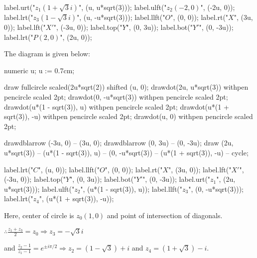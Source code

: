       label.urt("$z_1(1 + \sqrt{3}i)$", (u, u*sqrt(3)));
      label.ulft("$z_2(-2, 0)$", (-2u, 0));
      label.lrt("$z_3(1 - \sqrt{3}i)$", (u, -u*sqrt(3)));
      label.llft("$O$", (0, 0));
      label.rt("$X$", (3u, 0));
      label.lft("$X'$", (-3u, 0));
      label.top("$Y$", (0, 3u));
      label.bot("$Y'$", (0, -3u));
      label.lrt("$P(2, 0)$", (2u, 0));
    \stopMPcode
  \stopplacefigure
\item The diagram is given below:

    \startplacefigure[location=force]
    \startMPcode
      numeric u;
      u := 0.7cm;

      draw fullcircle scaled(2u*sqrt(2)) shifted (u, 0);
      drawdot(2u, u*sqrt(3)) withpen pencircle scaled 2pt;
      drawdot(0, -u*sqrt(3)) withpen pencircle scaled 2pt;
      drawdot(u*(1 - sqrt(3)), u) withpen pencircle scaled 2pt;
      drawdot(u*(1 + sqrt(3)), -u) withpen pencircle scaled 2pt;
      drawdot(u, 0) withpen pencircle scaled 2pt;

      drawdblarrow (-3u, 0) -- (3u, 0);
      drawdblarrow (0, 3u) -- (0, -3u);
      draw (2u, u*sqrt(3)) -- (u*(1 - sqrt(3)), u) -- (0, -u*sqrt(3)) -- (u*(1 + sqrt(3)), -u) -- cycle;

      label.lrt("$C$", (u, 0));
      label.llft("$O$", (0, 0));
      label.rt("$X$", (3u, 0));
      label.lft("$X'$", (-3u, 0));
      label.top("$Y$", (0, 3u));
      label.bot("$Y'$", (0, -3u));
      label.urt("$z_1$", (2u, u*sqrt(3)));
      label.ulft("$z_2$", (u*(1 - sqrt(3)), u));
      label.llft("$z_3$", (0, -u*sqrt(3)));
      label.lrt("$z_4$", (u*(1 + sqrt(3)), -u));
    \stopMPcode
  \stopplacefigure

  Here, center of circle is $z_0(1, 0)$ and point of intersection of diagonals.

  $\therefore \frac{z_1 + z_3}{2} = z_0\Rightarrow z_3 = -\sqrt{3}i$

  and $\frac{z_2 - 1}{z_1 - 1} = e^{\pm i\pi/2}\Rightarrow z_2 = (1 - \sqrt{3}) + i$ and $z_4 = (1 +
  \sqrt{3}) - i$.
\stopitemize
